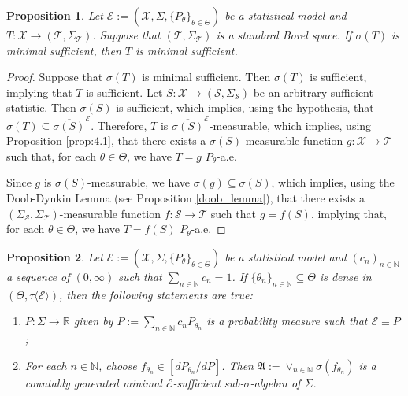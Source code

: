 \documentclass[12pt]{article}
\newtheorem{proposition}{Proposition}[section]
\begin{document}
\begin{proposition}
\label{prop:4.5}
Let $\mathcal{E}:=(\mathcal{X},\Sigma,\{P_\theta\}_{\theta\in\Theta})$ be a statistical model and $T:\mathcal{X}\to (\mathcal{T},\Sigma _\mathcal{T})$. Suppose that $(\mathcal{T},\Sigma _\mathcal{T})$ is a standard Borel space. If $\sigma (T)$ is minimal sufficient, then $T$ is minimal sufficient.
\end{proposition}

\begin{proof}
Suppose that $\sigma (T)$ is minimal sufficient. Then $\sigma (T)$ is sufficient, implying that $T$ is sufficient. Let $S:\mathcal{X}\to (\mathcal{S},\Sigma _\mathcal{S})$ be an arbitrary sufficient statistic. Then $\sigma (S)$ is sufficient, which implies, using the hypothesis, that $\sigma (T)\subseteq \overline{\sigma (S)}^\mathcal{E}$. Therefore, $T$ is $\overline{\sigma (S)}^\mathcal{E}$-measurable, which implies, using Proposition \ref{prop:4.1}, that there exists a $\sigma (S)$-measurable function $g:\mathcal{X}\to \mathcal{T}$ such that, for each $\theta\in\Theta$, we have $T=g$ $P_\theta$-a.e.

Since $g$ is $\sigma (S)$-measurable, we have $\sigma (g)\subseteq \sigma (S)$, which implies, using the Doob-Dynkin Lemma (see Proposition \ref{doob_lemma}), that there exists a $(\Sigma _\mathcal{S},\Sigma _\mathcal{T})$-measurable function $f:\mathcal{S}\to \mathcal{T}$ such that $g=f(S)$, implying that, for each $\theta\in\Theta$, we have $T=f(S)$ $P_\theta$-a.e.
\end{proof}

\begin{proposition}
\label{prop:4.7}
Let $\mathcal{E}:=(\mathcal{X},\Sigma,\{P_\theta\}_{\theta\in\Theta})$ be a statistical model and $(c_n)_{n\in\mathbb{N}}$ a sequence of $(0,\infty)$ such that $\sum _{n\in\mathbb{N}}c_n=1$. If $\{\theta _n\}_{n\in\mathbb{N}}\subseteq\Theta$ is dense in $(\Theta,\tau \langle \mathcal{E}\rangle )$, then the following statements are true:
    \begin{enumerate}[label=\roman*.]
    \item $P:\Sigma \to \mathbb{R}$ given by $P:=\sum _{n\in\mathbb{N}}c_nP_{\theta _n}$ is a probability measure such that $\mathcal{E}\equiv P$;
    \item For each $n\in\mathbb{N}$, choose $f_{\theta _n}\in [dP_{\theta _n}/dP]$. Then $\mathfrak{A}:=\vee _{n\in\mathbb{N}}\sigma (f_{\theta _n})$ is a countably generated minimal $\mathcal{E}$-sufficient sub-$\sigma$-algebra of $\Sigma$.
    \end{enumerate}
\end{proposition}
\end{document}
